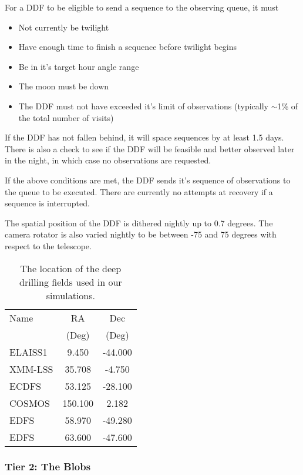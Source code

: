 For a DDF to be eligible to send a sequence to the observing queue, it must
\begin{itemize}
\item{Not currently be twilight}
\item{Have enough time to finish a sequence before twilight begins}
\item{Be in it's target hour angle range}
\item{The moon must be down}
\item{The DDF must not have exceeded it's limit of observations (typically $\sim$1\% of the total number of visits)}
\end{itemize}

If the DDF has not fallen behind, it will space sequences by at least 1.5 days. There is also a check to see if the DDF will be feasible and better observed later in the night, in which case no observations are requested.

If the above conditions are met, the DDF sends it's sequence of observations to the queue to be executed. There are currently no attempts at recovery if a sequence is interrupted. 

The spatial position of the DDF is dithered nightly up to 0.7 degrees.  The camera rotator is also varied nightly to be between -75 and 75 degrees with respect to the telescope. 

\begin{table}
\begin{centering}
\begin{tabular}{lcc}
\toprule
    Name &      RA &     Dec \\
    &          (Deg) &  (Deg) \\
    \hline
 ELAISS1 &   9.450 & -44.000 \\
 XMM-LSS &  35.708 &  -4.750 \\
   ECDFS &  53.125 & -28.100 \\
  COSMOS & 150.100 &   2.182 \\
    EDFS &  58.970 & -49.280 \\
    EDFS &  63.600 & -47.600 \\
    \hline
\end{tabular}
\caption{The location of the deep drilling fields used in our simulations.}\label{table:ddfs}
\end{centering}
\end{table}



\subsubsection{Tier 2:  The Blobs}

